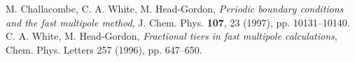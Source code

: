 \documentclass[a4paper,12pt,twoside]{report}
\begin{document}
%

	

%
%
\begin{thebibliography}{99}
   M. Challacombe, C. A. White, M. Head-Gordon,
    {\em Periodic boundary conditions and the fast multipole method},
    J. Chem. Phys. {\bf 107}, 23 (1997), pp. 10131--10140.
   C. A. White, M. Head-Gordon,
    {\em Fractional tiers in fast multipole calculations},
    Chem. Phys. Letters 257 (1996), pp. 647--650.

\end{thebibliography}
\end{document}
